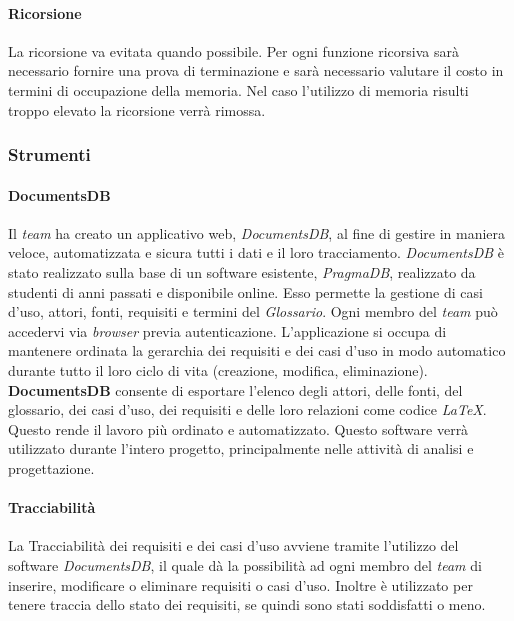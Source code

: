 \paragraph{Ricorsione}
La ricorsione va evitata quando possibile. Per ogni funzione ricorsiva sarà necessario fornire una prova di terminazione e sarà necessario valutare il costo in termini di occupazione della memoria. Nel caso l'utilizzo di memoria risulti troppo elevato la ricorsione verrà rimossa.

\subsubsection{Strumenti}

\paragraph{DocumentsDB}
Il \textit{team} ha creato un applicativo web, \textit{DocumentsDB}, al fine di gestire in maniera veloce, automatizzata
e sicura tutti i dati e il loro tracciamento. \textit{DocumentsDB} è stato realizzato sulla base di un software esistente, \textit{PragmaDB}, realizzato da
studenti di anni passati e disponibile online. Esso permette la gestione di casi d'uso, attori, fonti, requisiti e termini del \textit{Glossario}.
Ogni membro del \textit{team} può accedervi via \textit{browser} previa autenticazione.
L'applicazione si occupa di mantenere ordinata la gerarchia dei requisiti e dei casi d'uso in modo automatico durante tutto il loro ciclo di vita (creazione, modifica, eliminazione).
\textbf{DocumentsDB} consente di esportare l'elenco degli attori, delle fonti, del glossario, dei casi d'uso, dei requisiti e delle loro relazioni come codice \textit{\LaTeX{}}.
Questo rende il lavoro più ordinato e automatizzato. Questo software verrà utilizzato durante l'intero progetto, principalmente nelle attività di analisi e progettazione.

\paragraph{Tracciabilità}
La Tracciabilità dei requisiti e dei casi d'uso avviene tramite l'utilizzo del software \textit{DocumentsDB}, il quale dà la possibilità ad ogni membro del \textit{team} di inserire, modificare o eliminare requisiti o casi d'uso.
Inoltre è utilizzato per tenere traccia dello stato dei requisiti, se quindi sono stati soddisfatti o meno.

